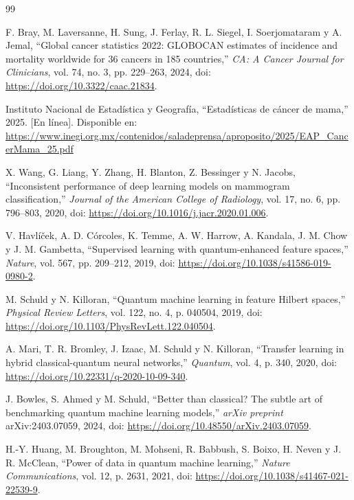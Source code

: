 \documentclass[conference,letterpaper]{IEEEtran}
\begin{document}
\begin{thebibliography}{99}

F. Bray, M. Laversanne, H. Sung, J. Ferlay, R. L. Siegel, I. Soerjomataram y A. Jemal, ``Global cancer statistics 2022: GLOBOCAN estimates of incidence and mortality worldwide for 36 cancers in 185 countries,'' \textit{CA: A Cancer Journal for Clinicians}, vol. 74, no. 3, pp. 229--263, 2024, doi: \url{https://doi.org/10.3322/caac.21834}.

Instituto Nacional de Estadística y Geografía, ``Estadísticas de cáncer de mama,'' 2025. [En línea]. Disponible en: \url{https://www.inegi.org.mx/contenidos/saladeprensa/aproposito/2025/EAP_CancerMama_25.pdf}

X. Wang, G. Liang, Y. Zhang, H. Blanton, Z. Bessinger y N. Jacobs, ``Inconsistent performance of deep learning models on mammogram classification,'' \textit{Journal of the American College of Radiology}, vol. 17, no. 6, pp. 796--803, 2020, doi: \url{https://doi.org/10.1016/j.jacr.2020.01.006}.

V. Havl{\'{i}}{\v{c}}ek, A. D. C{\'{o}}rcoles, K. Temme, A. W. Harrow, A. Kandala, J. M. Chow y J. M. Gambetta, ``Supervised learning with quantum-enhanced feature spaces,'' \textit{Nature}, vol. 567, pp. 209--212, 2019, doi: \url{https://doi.org/10.1038/s41586-019-0980-2}.

M. Schuld y N. Killoran, ``Quantum machine learning in feature {H}ilbert spaces,'' \textit{Physical Review Letters}, vol. 122, no. 4, p. 040504, 2019, doi: \url{https://doi.org/10.1103/PhysRevLett.122.040504}.

A. Mari, T. R. Bromley, J. Izaac, M. Schuld y N. Killoran, ``Transfer learning in hybrid classical-quantum neural networks,'' \textit{Quantum}, vol. 4, p. 340, 2020, doi: \url{https://doi.org/10.22331/q-2020-10-09-340}.

J. Bowles, S. Ahmed y M. Schuld, ``Better than classical? The subtle art of benchmarking quantum machine learning models,'' \textit{arXiv preprint} arXiv:2403.07059, 2024, doi: \url{https://doi.org/10.48550/arXiv.2403.07059}.

H.-Y. Huang, M. Broughton, M. Mohseni, R. Babbush, S. Boixo, H. Neven y J. R. McClean, ``Power of data in quantum machine learning,'' \textit{Nature Communications}, vol. 12, p. 2631, 2021, doi: \url{https://doi.org/10.1038/s41467-021-22539-9}.


\end{thebibliography}
\end{document}
